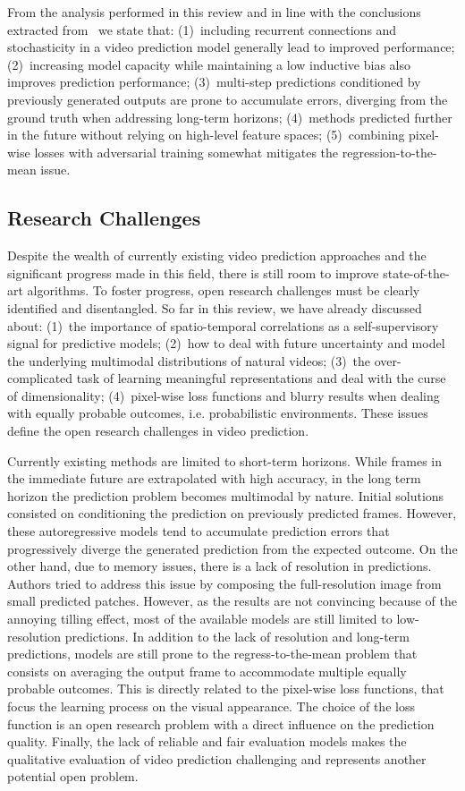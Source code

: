 From the analysis performed in this review and in line with the conclusions extracted from~\cite{Villegas2019} we state that: (1)~including recurrent connections and stochasticity in a video prediction model generally lead to improved performance; (2)~increasing model capacity while maintaining a low inductive bias also improves prediction performance; (3)~multi-step predictions conditioned by previously generated outputs are prone to accumulate errors, diverging from the ground truth when addressing long-term horizons; (4)~methods predicted further in the future without relying on high-level feature spaces; (5)~combining pixel-wise losses with adversarial training somewhat mitigates the regression-to-the-mean issue.

\subsection{Research Challenges}
Despite the wealth of currently existing video prediction approaches and the significant progress made in this field, there is still room to improve state-of-the-art algorithms. To foster progress, open research challenges must be clearly identified and disentangled. So far in this review, we have already discussed about: (1)~the importance of spatio-temporal correlations as a self-supervisory signal for predictive models; (2)~how to deal with future uncertainty and model the underlying multimodal distributions of natural videos; (3)~the over-complicated task of learning meaningful representations and deal with the curse of dimensionality; (4)~pixel-wise loss functions and blurry results when dealing with equally probable outcomes, i.e. probabilistic environments. These issues define the open research challenges in video prediction.

Currently existing methods are limited to short-term horizons. While frames in the immediate future are extrapolated with high accuracy, in the long term horizon the prediction problem becomes multimodal by nature. Initial solutions consisted on conditioning the prediction on previously predicted frames. However, these autoregressive models tend to accumulate prediction errors that progressively diverge the generated prediction from the expected outcome. On the other hand, due to memory issues, there is a lack of resolution in predictions. Authors tried to address this issue by composing the full-resolution image from small predicted patches. However, as the results are not convincing because of the annoying tilling effect, most of the available models are still limited to low-resolution predictions. In addition to the lack of resolution and long-term predictions, models are still prone to the regress-to-the-mean problem that consists on averaging the output frame to accommodate multiple equally probable outcomes. This is directly related to the pixel-wise loss functions, that focus the learning process on the visual appearance. The choice of the loss function is an open research problem with a direct influence on the prediction quality. Finally, the lack of reliable and fair evaluation models makes the qualitative evaluation of video prediction challenging and represents another potential open problem.

